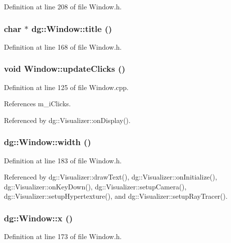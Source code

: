 Definition at line 208 of file Window.h.
\subsubsection{\setlength{\rightskip}{0pt plus 5cm}char $\ast$ dg::Window::title ()\hspace{0.3cm}{\tt  [inline]}}\label{classdg_1_1Window_a24}




Definition at line 168 of file Window.h.
\subsubsection{\setlength{\rightskip}{0pt plus 5cm}void Window::update\-Clicks ()}\label{classdg_1_1Window_a22}




Definition at line 125 of file Window.cpp.

References m\_\-i\-Clicks.

Referenced by dg::Visualizer::on\-Display().
\subsubsection{ dg::Window::width ()\hspace{0.3cm}{\tt  [inline]}}\label{classdg_1_1Window_a27}




Definition at line 183 of file Window.h.

Referenced by dg::Visualizer::draw\-Text(), dg::Visualizer::on\-Initialize(), dg::Visualizer::on\-Key\-Down(), dg::Visualizer::setup\-Camera(), dg::Visualizer::setup\-Hypertexture(), and dg::Visualizer::setup\-Ray\-Tracer().
\subsubsection{ dg::Window::x ()\hspace{0.3cm}{\tt  [inline]}}\label{classdg_1_1Window_a25}




Definition at line 173 of file Window.h.
